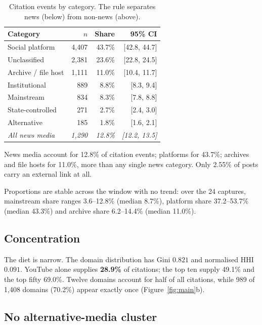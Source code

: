 \documentclass[11pt]{article}
\begin{document}
\begin{table}[t]
\centering
\small
\begin{tabular}{lrrr}
\toprule
Category & $n$ & Share & 95\% CI \\
\midrule
Social platform      & 4{,}407 & 43.7\% & [42.8, 44.7] \\
Unclassified         & 2{,}381 & 23.6\% & [22.8, 24.5] \\
Archive / file host  & 1{,}111 & 11.0\% & [10.4, 11.7] \\
Institutional        & 889     & 8.8\%  & [8.3, 9.4]   \\
\midrule
Mainstream           & 834     & 8.3\%  & [7.8, 8.8]   \\
State-controlled     & 271     & 2.7\%  & [2.4, 3.0]   \\
Alternative          & 185     & 1.8\%  & [1.6, 2.1]   \\
\midrule
\textit{All news media} & \textit{1{,}290} & \textit{12.8\%} & \textit{[12.2, 13.5]} \\
\bottomrule
\end{tabular}
\caption{Citation events by category. The rule separates news (below) from
non-news (above).}
\label{tab:shares}
\end{table}

News media account for 12.8\% of citation events; platforms for 43.7\%; archives
and file hosts for 11.0\%, more than any single news category. Only 2.55\% of
posts carry an external link at all.

Proportions are stable across the window with no trend: over the 24 captures,
mainstream share ranges 3.6--12.8\% (median 8.7\%), platform share 37.2--53.7\%
(median 43.3\%) and archive share 6.2--14.4\% (median 11.0\%).

\subsection{Concentration}

The diet is narrow. The domain distribution has Gini $0.821$ and normalised HHI
$0.091$. YouTube alone supplies \textbf{28.9\%} of citations; the top ten supply
49.1\% and the top fifty 69.0\%. Twelve domains account for half of all
citations, while 989 of 1{,}408 domains (70.2\%) appear exactly once
(Figure~\ref{fig:main}b).

\subsection{No alternative-media cluster}
\label{sec:network}
\end{document}
